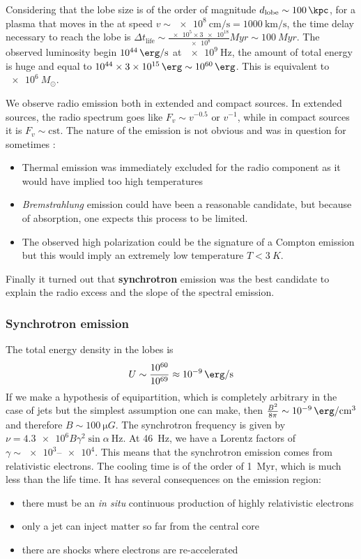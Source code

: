\documentclass[10pt,a4paper,english]{article}
\begin{document}
Considering that the lobe size is of the order of magnitude $d_\mathrm{lobe}\sim \SI{100}{\kpc}$, for a plasma that moves in the at speed $v\sim \SI{e8}{\cm\per\s} = \SI{1000}{\km\per\s}$, the time delay necessary to reach the lobe is $\Delta t_\mathrm{life} \sim \frac{\num{e5}\times\num{3e18}}{\num{e8}} \si{Myr} \sim \SI{100}{Myr}$. The observed luminosity begin $\SI{e44}{\erg\per\s}$ at $\SI{e9}{\Hz}$, the amount of total energy is huge and equal to $\num{e44}\times\SI{3e15}{\erg} \sim \SI{e60}{\erg}$. This is equivalent to $\SI{e6}{M_\odot}$.

We observe radio emission both in extended and compact sources. In extended sources, the radio spectrum goes like $F_v \sim v^{-0.5} \textrm{ or } v^{-1}$, while in compact sources it is $F_v \sim \mathrm{cst}$. The nature of the emission is not obvious and was in question for sometimes :
\begin{itemize}
    \item Thermal emission was immediately excluded for the radio component as it would have implied too high temperatures
    \item \emph{Bremstrahlung} emission could have been a reasonable candidate, but because of absorption, one expects this process to be limited.
    \item The observed high polarization could be the signature of a Compton emission but this would imply an extremely low temperature $T < \SI{3}{K}$.
\end{itemize}

Finally it turned out that \textbf{synchrotron} emission was the best candidate to explain the radio excess and the slope of the spectral emission.
\subsubsection{Synchrotron emission}
The total energy density in the lobes is
\begin{equation}
    U \sim \frac{10^{60}}{10^{69}} \approx \SI{e-9}{\erg\per\s}
\end{equation}
If we make a hypothesis of equipartition, which is completely arbitrary in the case of jets but the simplest assumption one can make, then $\frac{B^2}{8\pi} \sim \SI{e-9}{\erg\per\cm\cubed}$ and therefore $B \sim \SI{100}{\micro G}$. The synchrotron frequency is given by $\nu = \num{4.3e6} B\gamma^2 \sin\alpha\ \si{\Hz}$. At \SI{46}{Hz}, we have a Lorentz factors of $\gamma \sim \numrange{e3}{e4}$. This means that the synchrotron emission comes from relativistic electrons. The cooling time is of the order of \SI{1}{Myr}, which is much less than the life time. It has several consequences on the emission region:
\begin{itemize}
    \item there must be an \emph{in situ} continuous production of highly relativistic electrons
    \item only a jet can inject matter so far from the central core
    \item there are shocks where electrons are re-accelerated
\end{itemize}
\end{document}
